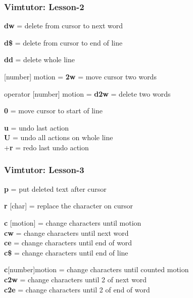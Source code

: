 \documentclass[table,dvipsnames]{beamer}
\begin{document}
	\begin{frame}
		\frametitle{Vimtutor: Lesson-2}
		\begin{exampleblock}{}
			\textbf{dw} = delete from cursor to next word
		\end{exampleblock}
	
		\begin{exampleblock}{}
			\textbf{d\$} = delete from cursor to end of line
		\end{exampleblock}
	
		\begin{exampleblock}{}
			\textbf{dd} = delete whole line
		\end{exampleblock}
	
		\begin{exampleblock}{}
			[number] motion = \textbf{2w} = move cursor two words
		\end{exampleblock}	
	
		\begin{exampleblock}{}
			operator [number] motion = \textbf{d2w} = delete two words
		\end{exampleblock}
	
		\begin{exampleblock}{}
			\textbf{0} = move cursor to start of line
		\end{exampleblock}	
	
		\begin{exampleblock}{}
			\textbf{u} = undo last action\\
			\textbf{U} = undo all actions on whole line\\
			\keys{\ctrl}+\textbf{r} = redo last undo action
		\end{exampleblock}
	\end{frame}

	\begin{frame}
		\frametitle{Vimtutor: Lesson-3}
		\begin{exampleblock}{}
			\textbf{p} = put deleted text after cursor
		\end{exampleblock}
	
		\begin{exampleblock}{}
			\textbf{r} [char] = replace the character on cursor
		\end{exampleblock}
	
		\begin{exampleblock}{}
			\textbf{c} [motion] = change characters until motion\\
			\textbf{cw} = change characters until next word\\
			\textbf{ce} = change characters until end of word\\
			\textbf{c\$} = change characters until end of line
		\end{exampleblock}
	
		\begin{exampleblock}{}
			\textbf{c}[number]motion = change characters until counted motion\\
			\textbf{c2w} = change characters until 2 of next word\\
			\textbf{c2e} = change characters until 2 of end of word
		\end{exampleblock}
	\end{frame}
\end{document}
